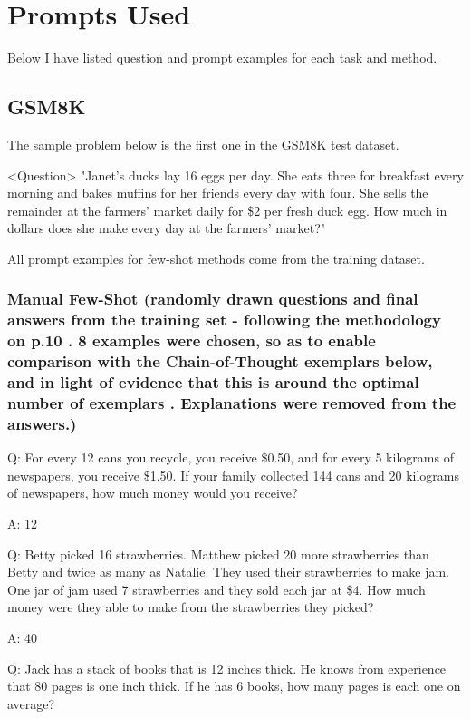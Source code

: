 \documentclass[11pt]{article}
\begin{document}
\clearpage
\newpage

\section{Prompts Used}
\label{sec:prompts}

Below I have listed question and prompt examples for each task and method.

\subsection{GSM8K}

The sample problem below is the first one in the GSM8K test dataset. \cite{cobbe_training_2021}

<Question> "Janet's ducks lay 16 eggs per day. She eats three for breakfast every morning and bakes muffins for her friends every day with four. She sells the remainder at the farmers' market daily for \$2 per fresh duck egg. How much in dollars does she make every day at the farmers' market?"

All prompt examples for few-shot methods come from the training dataset.

\subsubsection*{Manual Few-Shot (randomly drawn questions and final answers from the training set - following the methodology on p.10 \citealp{brown_language_2020}. 8 examples were chosen, so as to enable comparison with the Chain-of-Thought exemplars below, and in light of evidence that this is around the optimal number of exemplars \cite{min_rethinking_2022}. Explanations were removed from the answers.)}

Q: For every 12 cans you recycle, you receive \$0.50, and for every 5 kilograms of newspapers, you receive \$1.50. If your family collected 144 cans and 20 kilograms of newspapers, how much money would you receive?

A: 12

Q: Betty picked 16 strawberries. Matthew picked 20 more strawberries than Betty and twice as many as Natalie. They used their strawberries to make jam. One jar of jam used 7 strawberries and they sold each jar at \$4. How much money were they able to make from the strawberries they picked?

A: 40

Q: Jack has a stack of books that is 12 inches thick. He knows from experience that 80 pages is one inch thick. If he has 6 books, how many pages is each one on average?
\end{document}
